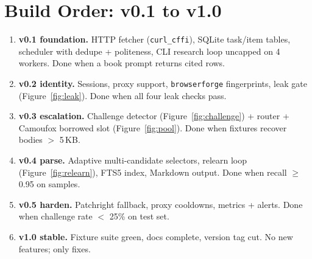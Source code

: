 \documentclass[11pt,a4paper]{article}
\begin{document}
\section{Build Order: v0.1 to v1.0}
\begin{enumerate}[leftmargin=*,itemsep=3pt]
\item \textbf{v0.1 foundation.} HTTP fetcher (\texttt{curl\_cffi}), SQLite task/item tables, scheduler with dedupe + politeness, CLI research loop uncapped on 4 workers. Done when a book prompt returns cited rows.
\item \textbf{v0.2 identity.} Sessions, proxy support, \texttt{browserforge} fingerprints, leak gate (Figure~\ref{fig:leak}). Done when all four leak checks pass.
\item \textbf{v0.3 escalation.} Challenge detector (Figure~\ref{fig:challenge}) + router + Camoufox borrowed slot (Figure~\ref{fig:pool}). Done when fixtures recover bodies $>$ 5\,KB.
\item \textbf{v0.4 parse.} Adaptive multi-candidate selectors, relearn loop (Figure~\ref{fig:relearn}), FTS5 index, Markdown output. Done when recall $\geq$ 0.95 on samples.
\item \textbf{v0.5 harden.} Patchright fallback, proxy cooldowns, metrics + alerts. Done when challenge rate $<$ 25\% on test set.
\item \textbf{v1.0 stable.} Fixture suite green, docs complete, version tag cut. No new features; only fixes.
\end{enumerate}
\end{document}
